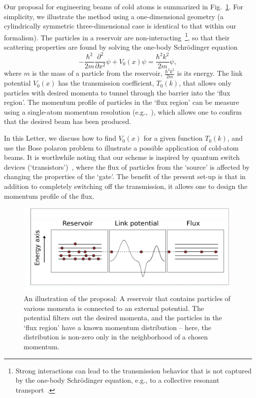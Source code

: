 \documentclass[twocolumn,amsmath,amssymb,showpacs,prl,superscriptaddress,aps]{revtex4-1}
\begin{document}
Our proposal for engineering beams of cold atoms is summarized in Fig.~\ref{fig:Figure1}.
For simplicity, we illustrate the method using a one-dimensional geometry 
(a cylindrically symmetric three-dimensional case is identical to that
within our formalism). The particles in a reservoir are non-interacting~\footnote{
Strong interactions can lead to the transmission behavior that is not captured by the one-body Schr{\"o}dinger equation, e.g.,
to a collective resonant transport~\cite{Schlagheck2005}.},
so that their scattering properties are found by solving the one-body Schr{\"o}dinger equation
\begin{equation}
-\frac{\hbar^2}{2m}\frac{\partial^2}{\partial x^2}\psi+V_0(x)\psi=\frac{\hbar^2k^2}{2m}\psi,
\label{eq:schr}
\end{equation}
where $m$ is the mass of a particle from the reservoir, $\frac{\hbar^2k^2}{2m}$ is its energy.
The link potential $V_0(x)$ has the transmission coefficient, $T_0(k)$, that allows only particles with desired momenta to 
tunnel through the barrier into the `flux region'. 
The momentum profile of particles in the `flux region' can be measure using a single-atom momentum resolution (e.g.,~\cite{jochim2018}),
which allows one to confirm that the desired beam has been produced.

In this Letter, we discuss how to 
find $V_0(x)$ for a given function $T_0(k)$, and use the Bose polaron problem
to illustrate a possible application of cold-atom beams. It is worthwhile noting that 
our scheme is inspired by quantum switch devices 
(`transistors')~\cite{zoller2004, marchukov2016}, where the flux of particles from the `source' is affected by changing the properties of the `gate'.
The benefit of the present set-up is that in addition to completely switching off the transmission, it allows one to design the momentum profile 
of the flux. 





\begin{figure}
\centerline{\includegraphics[scale=0.3]{figure1new.pdf}}
\caption{An illustration of the proposal: A reservoir that contains particles of various momenta is connected to an external potential. 
The potential filters out the desired momenta, and the particles in the `flux region' have a known momentum distribution -- here, 
the distribution is non-zero only in the neighborhood of a chosen momentum.
  }
\label{fig:Figure1}
\end{figure}
\end{document}
